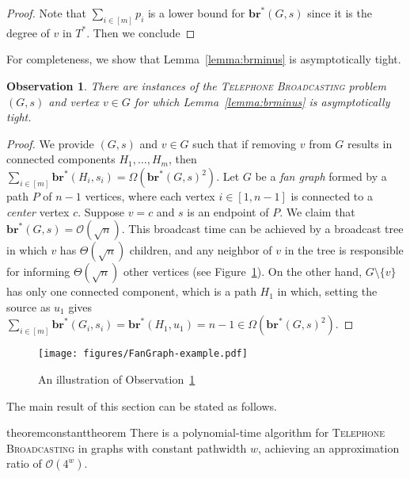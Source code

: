 \documentclass[letterpaper,11pt]{article}
\newtheorem{observation}{Observation}[section]
\newcommand{\bropt}{{\boldsymbol{br}^*}}
\newcommand{\oh}{\mathcal{O}}
\newcommand{\telebr}{\textsc{Telephone Broadcasting}\xspace}
\newcommand{\pwidth}{w}
\begin{document}
\begin{proof}
Note that $\sum_{i\in[m]} p_i$ is a lower bound for $\bropt(G,s)$ since it is the degree of $v$ in $T^*$. Then we conclude

\scalebox{.9}{
\begin{minipage}{1.2\textwidth}
\begin{align*}
    \sum_{i \in[m]} \bropt(H_i,s_i) \leq \bropt(G,s)(2\bropt(G,s)+1).
\end{align*}
\end{minipage}}
\end{proof}

For completeness, we show that Lemma~\ref{lemma:brminus} is asymptotically tight. 

\begin{observation}\label{observation:tighti}
    There are instances of the \telebr problem $(G,s)$ and vertex $v \in G$ for which Lemma~\ref{lemma:brminus} is asymptotically tight.
\end{observation}

\begin{proof}
    We provide $(G,s)$ and $v\in G$ such that if removing $v$ from $G$ results in connected components $H_1,\ldots, H_m$, then $\sum_{i\in [m]} \bropt(H_i,s_i) = \Omega( \bropt(G,s)^2)$. Let $G$ be a \emph{fan graph} formed by a path $P$ of $n-1$ vertices, where each vertex $i \in [1,n-1]$ is connected to a \emph{center} vertex $c$. Suppose $v=c$ and $s$ is an endpoint of $P$. 
    We claim that $\bropt(G, s) = \oh(\sqrt{n})$. 
    This broadcast time can be achieved by a broadcast tree in which $v$ has $\Theta(\sqrt{n})$ children, and any neighbor of $v$ in the tree is responsible for informing $\Theta(\sqrt{n})$ other vertices (see Figure~\ref{fig:fangraph-example}). On the other hand, $G \setminus \{v\}$ has only one connected component, which is a path $H_1$ in which, setting the source as $u_1$ gives $\sum_{i\in[m]} \bropt(G_i,s_i) = \bropt(H_1,u_1) = n-1 \in \Omega(\bropt(G,s)^2)$. 
\end{proof}

\begin{figure}
	\centering
\texttt{[image: figures/FanGraph-example.pdf]}
	\caption{An illustration of Observation~\ref{observation:tighti}}
    \label{fig:fangraph-example}
\end{figure}

The main result of this section can be stated as follows.

\begin{restatable}{theorem}{constanttheorem}\label{thm:approximation-constant}
There is a polynomial-time algorithm for \telebr in graphs with constant pathwidth $\pwidth$, achieving an approximation ratio of $\oh(4^{\pwidth})$.
\end{restatable}
\end{document}
